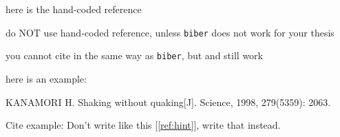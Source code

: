 \chapter{\bibname}

\begin{manref}
\item \label{ref:hint} here is the hand-coded reference
\item do NOT use hand-coded reference, unless \texttt{biber} does not work for your thesis
\item you cannot cite in the same way as \texttt{biber}, but  and  still work
\item here is an example:
\item \label{ref:man} KANAMORI H. Shaking without quaking[J]. Science, 1998, 279(5359): 2063.
\end{manref}

Cite example:
Don't write like this [\ref{ref:hint}],
write that instead.
